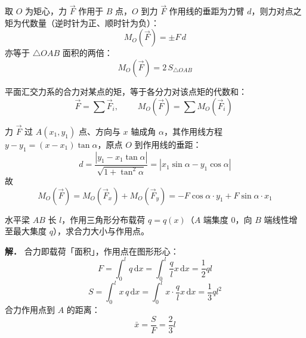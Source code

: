  取 $O$ 为矩心，力 $\vec{F}$ 作用于 $B$ 点，$O$ 到力 $\vec{F}$ 作用线的垂距为力臂 $d$，则力对点之矩为代数量（逆时针为正、顺时针为负）：
\begin{equation}
M_O(\vec{F})=\pm F\,d
\label{eq:2-力偶-定义}
\end{equation}
亦等于 $\triangle OAB$ 面积的两倍：
\begin{equation}
M_O(\vec{F})=2\,S_{\triangle OAB}
\label{eq:2-力偶-面积}
\end{equation}

 平面汇交力系的合力对某点的矩，等于各分力对该点矩的代数和：
\begin{equation}
\vec{F}=\sum\vec{F}_i,\qquad
\boxed{\;M_O(\vec{F})=\sum M_O(\vec{F}_i)\;}
\label{eq:2-力偶-合力矩}
\end{equation}

 力 $\vec{F}$ 过 $A(x_1,y_1)$ 点、方向与 $x$ 轴成角 $\alpha$，其作用线方程 $y-y_1=(x-x_1)\tan\alpha$，原点 $O$ 到作用线的垂距：
\begin{equation}
d=\frac{|y_1-x_1\tan\alpha|}{\sqrt{1+\tan^2\alpha}}=\left|x_1\sin\alpha-y_1\cos\alpha\right|
\label{eq:2-力偶-垂距}
\end{equation}
故
\begin{equation}
M_O(\vec{F})=M_O(\vec{F}_x)+M_O(\vec{F}_y)=-F\cos\alpha\cdot y_1+F\sin\alpha\cdot x_1
\label{eq:2-力偶-合力矩坐标}
\end{equation}

\begin{example}[求分布力的合力]
水平梁 $AB$ 长 $l$，作用三角形分布载荷 $q=q(x)$（$A$ 端集度 $0$，向 $B$ 端线性增至最大集度 $q$），求合力大小与作用点。

\textbf{解．} 合力即载荷「面积」，作用点在图形形心：
\begin{equation}
F=\int_0^l q\,\mathrm{d}x=\int_0^l \frac{q}{l}x\,\mathrm{d}x=\frac12 ql
\label{eq:2-例-分布力-合力}
\end{equation}
\begin{equation}
S=\int_0^l x\,q\,\mathrm{d}x=\int_0^l x\cdot\frac{q}{l}x\,\mathrm{d}x=\frac13 ql^2
\label{eq:2-例-分布力-静矩}
\end{equation}
合力作用点到 $A$ 的距离：
\begin{equation}
\bar{x}=\frac{S}{F}=\frac{2}{3}l
\label{eq:2-例-分布力-作用点}
\end{equation}
\end{example}

